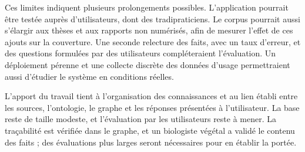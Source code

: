Ces limites indiquent plusieurs prolongements possibles. L'application pourrait être testée auprès d'utilisateurs, dont des tradipraticiens. Le corpus pourrait aussi s'élargir aux thèses et aux rapports non numérisés, afin de mesurer l'effet de ces ajouts sur la couverture. Une seconde relecture des faits, avec un taux d'erreur, et des questions formulées par des utilisateurs compléteraient l'évaluation. Un déploiement pérenne et une collecte discrète des données d'usage permettraient aussi d'étudier le système en conditions réelles.

L'apport du travail tient à l'organisation des connaissances et au lien établi entre les sources, l'ontologie, le graphe et les réponses présentées à l'utilisateur. La base reste de taille modeste, et l'évaluation par les utilisateurs reste à mener. La traçabilité est vérifiée dans le graphe, et un biologiste végétal a validé le contenu des faits ; des évaluations plus larges seront nécessaires pour en établir la portée.
